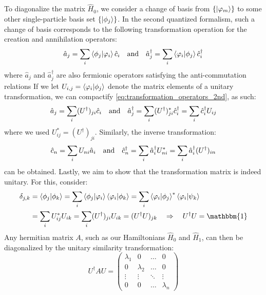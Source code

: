 \documentclass[11pt, a4paper, oneside]{book}
\theoremstyle{definition} %
\begin{document}
To diagonalize the matrix $\hat{H}_0$, we consider a change of basis from $\{ \ket{\varphi_m}\}$ to some other single-particle basis set $\{ \ket{\phi_j}\}$. In the second quantized formalism, such a change of basis corresponds to the following transformation operation for the creation and annihilation operators:
	 \begin{equation}
	 	\hat{a}_j = \sum_i \braket{\phi_j}{\varphi_i} \hat{c}_i \qq{and} \hat{a}_j^\dagger =\sum_i \braket{\varphi_i}{\phi_j} \hat{c}_i^\dagger
	 	\label{eq:transformation_operators_2nd}
	 \end{equation}
	 where $\hat{a}_j$ and $\hat{a}_j^\dagger$ are also fermionic operators satisfying the anti-commutation relations
	 If we let $U_{i,j} = \braket{\varphi_i}{\phi_j}$ denote the matrix elements of a unitary transformation, we can compactify \ref{eq:transformation_operators_2nd}, as such:
	 \begin{equation}
	 	\hat{a}_j = \sum_i (U^\dagger)_{ji} \hat{c}_i \qq{and} \hat{a}_j^\dagger = \sum_i (U^\dagger)^*_{ji} \hat{c}_i^\dagger =\sum_{i}  \hat{c}_i^\dagger U_{ij}
	 \end{equation}
	 where we used $U_{ij}^* = (U^\dagger)_{ji}$. Similarly, the inverse transformation:
	 \begin{equation}
	 	\hat{c}_n = \sum_i U_{ni} \hat{a}_i \qq{and} \hat{c}_n^\dagger = \sum_i \hat{a}_i^\dagger U^*_{ni} = \sum_i \hat {a}_i^\dagger (U^\dagger)_{in}
	 	\label{eq:inverse_transformation_operators2nd}
	 \end{equation}
	 can be obtained. Lastly, we aim to show that the transformation matrix is indeed unitary. For this, consider:
	 \begin{align}
	 	\delta_{j,k} &= \braket{\phi_j}{\phi_k} = \sum_i \braket{\phi_j}{\varphi_i}\braket{\varphi_i}{\phi_k} = \sum_i \braket{\varphi_i}{\phi_j}^* \braket{\varphi_i}{\psi_k} \\
	 	&= \sum_i U_{ij}^* U_{ik} = \sum_i (U^\dagger)_{ji} U_{ik} = (U^\dagger U)_{jk} \quad \Rightarrow \quad U^\dagger U = \mathbbm{1}
	 \end{align}
	Any hermitian matrix $A$, such as our Hamiltonians $\hat{H}_0$ and $\hat{H}_1$, can then be diagonalized by the unitary similarity transformation:
	 \begin{equation}
	 	U^\dagger A U = \begin{pmatrix}
	 		\lambda_1 & 0 &\dots & 0 \\
	 		0 & \lambda_2 & \dots & 0 \\
	 		\vdots & \vdots & \ddots & \vdots \\
	 		0 & 0 & \dots & \lambda_n
	 	\end{pmatrix}
	 	\label{eq:unitary_similarity_transformation}
	 \end{equation}
\end{document}

